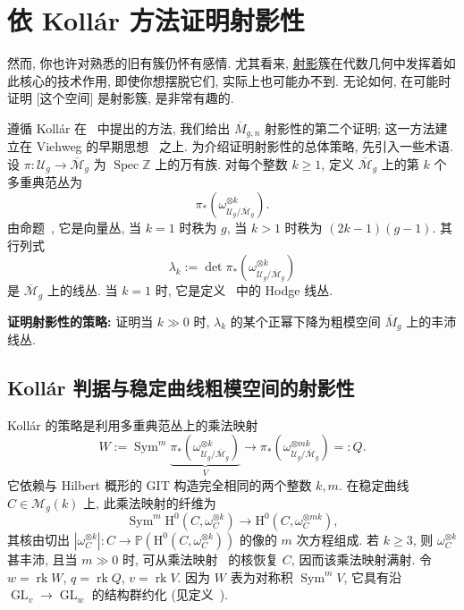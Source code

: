 \section{依 Kollár 方法证明射影性}\label{src:6.9}
\begin{epigraph}
然而, 你也许对熟悉的旧有簇仍怀有感情. 尤其看来, \underline{射影}簇在代数几何中发挥着如此核心的技术作用, 即使你想摆脱它们, 实际上也可能办不到. 无论如何, 在可能时证明 [这个空间] 是射影簇, 是非常有趣的.
\end{epigraph}
遵循 Kollár 在~\cite{Kol90} 中提出的方法, 我们给出 $\overline M_{g,\allowbreak n}$ 射影性的第二个证明; 这一方法建立在 Viehweg 的早期思想~\cite{Vie95} 之上. 为介绍证明射影性的总体策略, 先引入一些术语. 设 $\pi:\mathcal U_g\to\overline{\mathcal M}_g$ 为 $\operatorname{Spec}\mathbb Z$ 上的万有族. 对每个整数 $k\geq1$, 定义 $\overline{\mathcal M}_g$ 上的第 $k$ 个多重典范丛为
\[
\pi_*(\omega_{\mathcal U_g/\overline{\mathcal M}_g}^{\otimes k}).
\]
由命题~, 它是向量丛, 当 $k=1$ 时秩为 $g$, 当 $k>1$ 时秩为 $(2k-1)(g-1)$. 其行列式
\[
\lambda_k:=\det\pi_*(\omega_{\mathcal U_g/\overline{\mathcal M}_g}^{\otimes k})
\]
是 $\overline{\mathcal M}_g$ 上的线丛. 当 $k=1$ 时, 它是定义~ 中的 Hodge 线丛.

\noindent\textbf{证明射影性的策略:} 证明当 $k\gg0$ 时, $\lambda_k$ 的某个正幂下降为粗模空间 $\overline M_g$ 上的丰沛线丛.
\subsection{Kollár 判据与稳定曲线粗模空间的射影性}\label{src:6.9.1-subsection}
Kollár 的策略是利用多重典范丛上的乘法映射
\begin{equation}\label{src:6.9.1}
W:=\operatorname{Sym}^m\underbrace{\pi_*(\omega_{\mathcal U_g/\overline{\mathcal M}_g}^{\otimes k})}_{V}
\longrightarrow\pi_*(\omega_{\mathcal U_g/\overline{\mathcal M}_g}^{\otimes mk})=:Q.
\end{equation}
它依赖与 Hilbert 概形的 GIT 构造完全相同的两个整数 $k,\allowbreak m$. 在稳定曲线 $C\in\mathcal M_g(k)$ 上, 此乘法映射的纤维为
\[
\operatorname{Sym}^m\mathrm H^0(C,\omega_C^{\otimes k})\longrightarrow\mathrm H^0(C,\omega_C^{\otimes mk}),
\]
其核由切出 $|\omega_C^{\otimes k}|:C\to\mathbb P(\mathrm H^0(C,\allowbreak \omega_C^{\otimes k}))$ 的像的 $m$ 次方程组成. 若 $k\geq3$, 则 $\omega_C^{\otimes k}$ 甚丰沛, 且当 $m\gg0$ 时, 可从乘法映射~ 的核恢复 $C$, 因而该乘法映射满射. 令 $w=\operatorname{rk}W$, $q=\operatorname{rk}Q$, $v=\operatorname{rk}V$. 因为 $W$ 表为对称积 $\operatorname{Sym}^mV$, 它具有沿 $\operatorname{GL}_v\to\operatorname{GL}_w$ 的结构群约化 (见定义~).

